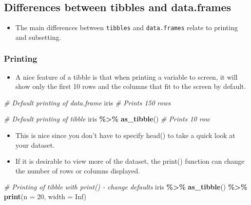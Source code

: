 \documentclass[
]{book}
\newenvironment{Shaded}{\begin{snugshade}}{\end{snugshade}}
\newcommand{\AttributeTok}[1]{\textcolor[rgb]{0.13,0.29,0.53}{#1}}
\newcommand{\CommentTok}[1]{\textcolor[rgb]{0.56,0.35,0.01}{\textit{#1}}}
\newcommand{\ConstantTok}[1]{\textcolor[rgb]{0.56,0.35,0.01}{#1}}
\newcommand{\DecValTok}[1]{\textcolor[rgb]{0.00,0.00,0.81}{#1}}
\newcommand{\FunctionTok}[1]{\textcolor[rgb]{0.13,0.29,0.53}{\textbf{#1}}}
\newcommand{\NormalTok}[1]{#1}
\newcommand{\SpecialCharTok}[1]{\textcolor[rgb]{0.81,0.36,0.00}{\textbf{#1}}}
\providecommand{\tightlist}{%
  \setlength{\itemsep}{0pt}\setlength{\parskip}{0pt}}
\begin{document}
\subsection{Differences between tibbles and data.frames}\label{differences-between-tibbles-and-data.frames}

\begin{itemize}
\tightlist
\item
  The main differences between \texttt{tibbles} and \texttt{data.frames} relate to printing and subsetting.
\end{itemize}

\subsubsection{Printing}\label{printing}

\begin{itemize}
\tightlist
\item
  A nice feature of a tibble is that when printing a variable to screen, it will show only the first 10 rows and the columns that fit to the screen by default.
\end{itemize}

\begin{Shaded}
\begin{Highlighting}[]
\CommentTok{\# Default printing of data.frame}
\NormalTok{iris }\CommentTok{\# Prints 150 rows}

\CommentTok{\# Default printing of tibble}
\NormalTok{iris }\SpecialCharTok{\%\textgreater{}\%}
  \FunctionTok{as\_tibble}\NormalTok{() }\CommentTok{\# Prints 10 row}
\end{Highlighting}
\end{Shaded}

\begin{itemize}
\tightlist
\item
  This is nice since you don't have to specify head() to take a quick look at your dataset.
\item
  If it is desirable to view more of the dataset, the print() function can change the number of rows or columns displayed.
\end{itemize}

\begin{Shaded}
\begin{Highlighting}[]
\CommentTok{\# Printing of tibble with print() {-} change defaults}
\NormalTok{iris }\SpecialCharTok{\%\textgreater{}\%}
  \FunctionTok{as\_tibble}\NormalTok{() }\SpecialCharTok{\%\textgreater{}\%}
  \FunctionTok{print}\NormalTok{(}\AttributeTok{n =} \DecValTok{20}\NormalTok{, }\AttributeTok{width =} \ConstantTok{Inf}\NormalTok{)}
\end{Highlighting}
\end{Shaded}
\end{document}
